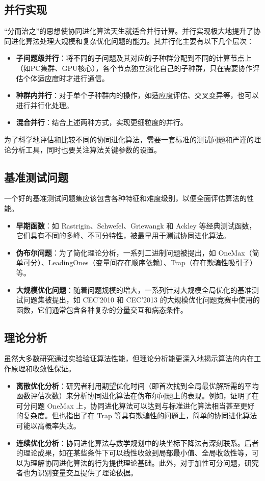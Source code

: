 \subsection{并行实现}
“分而治之”的思想使协同进化算法天生就适合并行计算。并行实现极大地提升了协同进化算法处理大规模和复杂优化问题的能力。其并行化主要有以下几个层次：
    \begin{itemize}
        \item \textbf{子问题级并行}：将不同的子问题及其对应的子种群分配到不同的计算节点上（如PC集群、GPU核心），各个节点独立演化自己的子种群，只在需要协作评估个体适应度时才进行通信。
        \item \textbf{种群内并行}：对于单个子种群内的操作，如适应度评估、交叉变异等，也可以进行并行化处理。
        \item \textbf{混合并行}：结合上述两种方式，实现更细粒度的并行。
    \end{itemize}

为了科学地评估和比较不同的协同进化算法，需要一套标准的测试问题和严谨的理论分析工具，同时也要关注算法关键参数的设置。

\subsection{基准测试问题}
一个好的基准测试问题集应该包含各种特征和难度级别，以便全面评估算法的性能。
    \begin{itemize}
        \item \textbf{早期函数}：如 Rastrigin、Schwefel、Griewangk 和 Ackley 等经典测试函数，它们具有不同的多峰、不可分特性，被最早用于测试协同进化算法。
        \item \textbf{伪布尔问题}：为了简化理论分析，一系列二进制问题被提出，如 OneMax（简单可分）、LeadingOnes（变量间存在顺序依赖）、Trap（存在欺骗性吸引子）等。
        \item \textbf{大规模优化问题}：随着问题规模的增大，一系列针对大规模全局优化的基准测试问题集被提出，如 CEC'2010 和 CEC'2013 的大规模优化问题竞赛中使用的函数，它们通常包含各种复杂的分量交互和病态条件。
    \end{itemize}

\subsection{理论分析}
虽然大多数研究通过实验验证算法性能，但理论分析能更深入地揭示算法的内在工作原理和收敛性保证。
    \begin{itemize}
        \item \textbf{离散优化分析}：研究者利用期望优化时间（即首次找到全局最优解所需的平均函数评估次数）来分析协同进化算法在伪布尔问题上的表现。例如，证明了在可分问题 OneMax 上，协同进化算法可以达到与标准进化算法相当甚至更好的复杂度。但也指出了在 Trap 等具有欺骗性的问题上，简单的协同进化算法可能以高概率失败。
        \item \textbf{连续优化分析}：协同进化算法与数学规划中的块坐标下降法有深刻联系。后者的理论成果，如在某些条件下可以线性收敛到局部最小值、全局收敛性等，可以为理解协同进化算法的行为提供理论基础。此外，对于加性可分问题，研究者也为识别变量交互提供了理论依据。
    \end{itemize}

